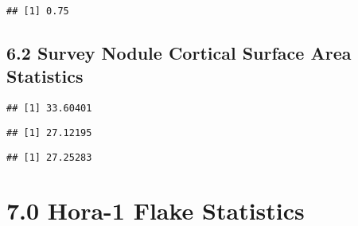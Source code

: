 \documentclass[
]{article}
\newenvironment{Shaded}{\begin{snugshade}}{\end{snugshade}}
\newcommand{\FunctionTok}[1]{\textcolor[rgb]{0.13,0.29,0.53}{\textbf{#1}}}
\newcommand{\NormalTok}[1]{#1}
\newcommand{\SpecialCharTok}[1]{\textcolor[rgb]{0.81,0.36,0.00}{\textbf{#1}}}
\begin{document}
\begin{verbatim}
## [1] 0.75
\end{verbatim}

\hypertarget{survey-nodule-cortical-surface-area-statistics}{%
\subsection{6.2 Survey Nodule Cortical Surface Area
Statistics}\label{survey-nodule-cortical-surface-area-statistics}}

\begin{Shaded}
\end{Shaded}

\begin{verbatim}
## [1] 33.60401
\end{verbatim}

\begin{Shaded}
\end{Shaded}

\begin{verbatim}
## [1] 27.12195
\end{verbatim}

\begin{Shaded}
\end{Shaded}

\begin{verbatim}
## [1] 27.25283
\end{verbatim}

\hypertarget{hora-1-flake-statistics}{%
\section{7.0 Hora-1 Flake Statistics}\label{hora-1-flake-statistics}}
\end{document}
